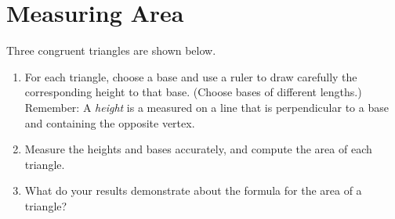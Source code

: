 \newpage

\section{Measuring Area}

\begin{prob}
Three congruent triangles are shown below.   
\begin{enumerate}
\item For each triangle, choose a base and use a ruler to draw carefully the corresponding height to that base.  (Choose bases of different lengths.)  Remember:  A \emph{height} is a measured on a line that is perpendicular to a base and containing the opposite vertex. 
\item Measure the heights and bases accurately, and compute the area of each triangle.  
\item What do your results demonstrate about the formula for the area of a triangle?  
\end{enumerate}


\end{prob}
